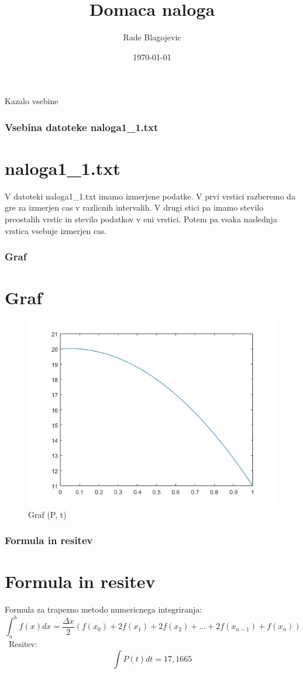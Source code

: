 \documentclass[svgnames]{beamer}
\title{\textbf{Domaca naloga}}
\author{Rade Blagojevic}
\date{\today}
\begin{document}
\frame{\titlepage}

\begin{frame}{Kazalo vsebine}
    \tableofcontents
\end{frame}

\begin{frame}
\frametitle{Vsebina datoteke naloga1\_1.txt}
\section{naloga1\_1.txt}
V datoteki naloga1\_1.txt imamo izmerjene podatke. V prvi vrstici razberemo da gre za izmerjen cas v razlicnih intervalih. V drugi stici pa imamo stevilo preostalih vrstic in stevilo podatkov v eni vrstici. Potem pa vsaka naslednja vrstica vsebuje izmerjen cas.
\end{frame}

\begin{frame}
\frametitle{Graf}
\section{Graf}
\begin{figure}
    \centering
    \includegraphics[width=0.7\linewidth]{Graf.jpg}
    \caption{Graf (P, t)}
    \label{fig:enter-label}
\end{figure}
\end{frame}

\begin{frame}
\frametitle{Formula in resitev}
\section{Formula in resitev}
     Formula za trapezno metodo numericnega integriranja: 
    \[\int_a^b f(x)dx = \frac{\Delta x}{2} (f(x_0)+2f(x_1)+2f(x_2)+...+2f(x_{n-1})+f(x_n))\]\
    Resitev:
     \[\int P(t)dt = 17,1665\]\
\end{frame}
\end{document}
